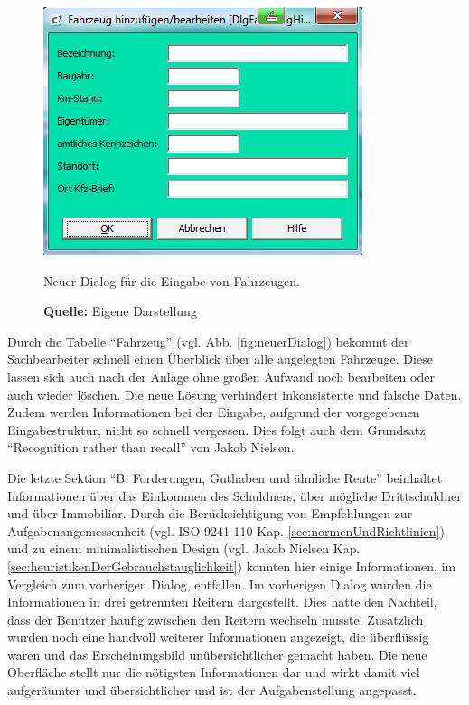\begin{figure}[H]
  \centering
  \includegraphics[scale=0.9]{img/FahrzeugAnlegenBearbeiten_Dialog.PNG}
  \caption{Neuer Dialog für die Eingabe von Fahrzeugen.}
    \caption*{\textbf{Quelle:} Eigene Darstellung}
  \label{fig:fahrzeugAnlegenBearbeitenDialog}
\end{figure}
Durch die Tabelle \enquote{Fahrzeug} (vgl. Abb. \ref{fig:neuerDialog}) bekommt der Sachbearbeiter schnell einen Überblick über alle angelegten Fahrzeuge. Diese lassen sich auch nach der Anlage ohne großen Aufwand noch bearbeiten oder auch wieder löschen. Die neue Lösung verhindert inkonsistente und falsche Daten. Zudem werden Informationen bei der Eingabe, aufgrund der vorgegebenen Eingabestruktur, nicht so schnell vergessen. Dies folgt auch dem Grundsatz \enquote{Recognition rather than recall} von Jakob Nielsen.

Die letzte Sektion \enquote{B. Forderungen, Guthaben und ähnliche Rente} beinhaltet Informationen über das Einkommen des Schuldners, über mögliche Drittschuldner und über Immobiliar. Durch die Berücksichtigung von Empfehlungen zur Aufgabenangemessenheit (vgl. ISO 9241-110 Kap. \ref{sec:normenUndRichtlinien}) und zu einem minimalistischen Design (vgl. Jakob Nielsen Kap. \ref{sec:heuristikenDerGebrauchstauglichkeit}) konnten hier einige Informationen, im Vergleich zum vorherigen Dialog, entfallen. Im vorherigen Dialog wurden die Informationen in drei getrennten Reitern dargestellt. Dies hatte den Nachteil, dass der Benutzer häufig zwischen den Reitern wechseln musste. Zusätzlich wurden noch eine handvoll weiterer Informationen angezeigt, die überflüssig waren und das Erscheinungsbild unübersichtlicher gemacht haben. Die neue Oberfläche stellt nur die nötigsten Informationen dar und wirkt damit viel aufgeräumter und übersichtlicher und ist der Aufgabenstellung angepasst.

